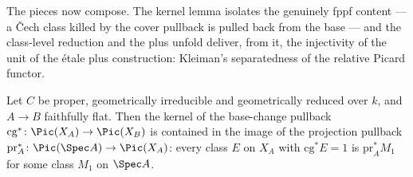The pieces now compose.  The kernel lemma isolates the genuinely fppf content — a \v Cech class
killed by the cover pullback is pulled back from the base — and the class-level reduction and the
plus unfold deliver, from it, the injectivity of the unit of the \'etale plus construction:
Kleiman's separatedness of the relative Picard functor.

\begin{theorem}
  \label{pa-thm:exists_cechPic_map_snd_of_ker_whiskerLeft}
  \leanok

  Let \(C\) be proper, geometrically irreducible and geometrically reduced over \(k\), and \(A
  \to B\) faithfully flat.  Then the kernel of the base-change pullback \(\mathrm{cg}^{*} \colon
  \Pic(X_A) \to \Pic(X_B)\) is contained in the image of the projection pullback
  \(\mathrm{pr}_A^{*} \colon \Pic(\Spec A) \to \Pic(X_A)\): every class \(E\) on \(X_A\) with
  \(\mathrm{cg}^{*} E = 1\) is \(\mathrm{pr}_A^{*} M_1\) for some class \(M_1\) on \(\Spec A\).
\end{theorem}

